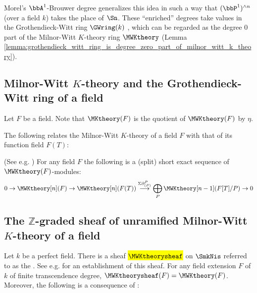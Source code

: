 Morel's $\bbA^1$-Brouwer degree generalizes this idea in such a way that $(\bbP^1)^{\wedge n}$ (over a field $k$) takes the place of $\Sn$. These ``enriched'' degrees take values in the Grothendieck-Witt ring $\GWring(k)$ , which can be regarded as the degree $0$ part of the Milnor-Witt $K$-theory ring $\MWKtheory$ (Lemma \ref{lemma:grothendieck_witt_ring_is_degree_zero_part_of_milnor_witt_k_theory}).

\subsection{Milnor-Witt \texorpdfstring{$K$}{K}-theory and the Grothendieck-Witt ring of a field}

 

 

\begin{remark}
Let $F$ be a field. Note that $\MKtheory(F)$ is the quotient of $\MWKtheory(F)$ by $\eta$.
\end{remark}


 



The following relates the Milnor-Witt $K$-theory of a field $F$ with that of its function field $F(T)$:

\begin{theorem}(See e.g. \cite[Theorem 3.24]{morel_a1at})
For any field $F$ the following is a (split) short exact sequence of $\MWKtheory(F)$-modules:
$$  0 \rightarrow \MWKtheory[n](F) \rightarrow \MWKtheory[n](F(T)) \stackrel{\Sigma \partial_{(P)}^{P}}{\longrightarrow} \bigoplus_{P} \MWKtheory[n-1](F[T]/P) \rightarrow 0  $$ 
\end{theorem}


\subsection{The \texorpdfstring{$\mathbb{Z}$}{Z}-graded sheaf of unramified Milnor-Witt \texorpdfstring{$K$}{K}-theory of a field}

Let $k$ be a perfect field. There is a sheaf \hl{$\MWKtheorysheaf$} on $\SmkNis$ referred to as the . See e.g. \cite[The discussions surrounding Lemma 3.32, Theorem 2.46]{morel_a1at} for an establishment of this sheaf. For any field extension $F$ of $k$ of finite transcendence degree, $\MWKtheorysheaf(F) = \MWKtheory(F)$. Moreover, the following is a consequence of \cite[Theorem 3.22]{morel_a1at}: 

